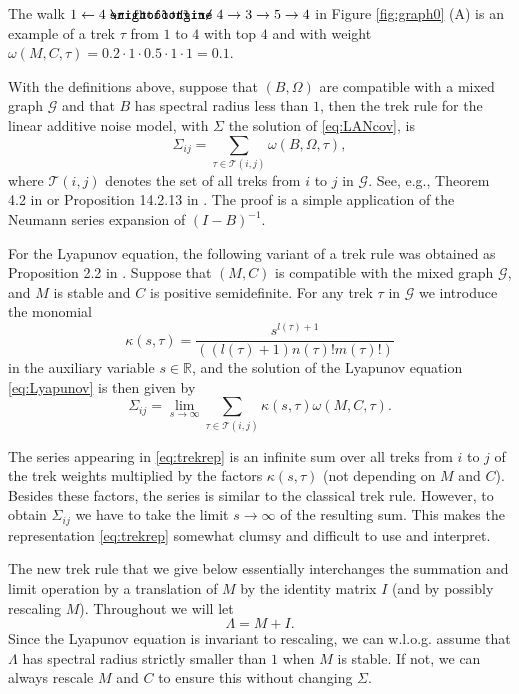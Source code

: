\documentclass[10pt,twoside,a4paper]{amsart}
\DeclareRobustCommand{\unEdge}{%
	\mathrel{%
		\text{%
			\ooalign{$\rightfootline$\cr\reflectbox{$\rightfootline$}\cr}%
		}%
	}%
}
\begin{document}
The walk $1 \leftarrow 4 \unEdge 4  \rightarrow 3 \rightarrow 5 \rightarrow 4$ 
in Figure \ref{fig:graph0} (A) is an example of a trek $\tau$ from $1$ to $4$ with top $4$ 
and with weight $\omega(M, C, \tau) =  0.2 \cdot 1 \cdot 0.5 \cdot 1 \cdot 1 = 0.1$.


With the definitions above, suppose that $(B, \Omega)$ are compatible with a
mixed graph $\mathcal{G}$ and that $B$ has spectral radius less than $1$, then
the trek rule for the linear additive noise model, with $\Sigma$ the solution of
\eqref{eq:LANcov}, is 
\[
    \Sigma_{ij} = \sum_{\tau \in \mathcal{T}(i,j)} \omega(B, \Omega, \tau),
\]
where $ \mathcal{T}(i,j)$ denotes the set of all treks from $i$ to $j$ in
$\mathcal{G}$. See, e.g., Theorem 4.2 in \cite{drton2018} or Proposition 14.2.13 in
\cite{sullivant2018algebraic}. The proof is a simple application of the Neumann
series expansion of $(I - B)^{-1}$. 

For the Lyapunov equation, the
following variant of a trek rule was obtained as Proposition 2.2 in \cite{varando2020}. 
Suppose that $(M, C)$ is compatible with the mixed graph $\mathcal{G}$, and $M$ is
stable and $C$ is positive semidefinite. For any trek $\tau$ in $\mathcal{G}$
we introduce the monomial 
\[
    \kappa(s, \tau) = \frac{s^{l(\tau) + 1}}{((l(\tau) + 1)n(\tau)!m(\tau)!)}
\]
in the auxiliary variable $s \in \mathbb{R}$, and the solution of the Lyapunov
    equation \eqref{eq:Lyapunov} is then given by
    \begin{equation} \label{eq:trekrep}
    \Sigma_{ij} = \lim_{s \rightarrow \infty} 
    \sum_{\tau \in \mathcal{T}(i,j)} \kappa(s, \tau) \omega(M, C, \tau).
    \end{equation}


The series appearing in \eqref{eq:trekrep} is an infinite sum 
over all treks from $i$ to $j$ of the trek weights multiplied by
the factors $\kappa(s, \tau)$ (not depending on $M$ and $C$). Besides 
these factors, the series is similar to the classical trek rule. However, 
to obtain $\Sigma_{ij}$ we have to take the limit 
$s \rightarrow \infty$ of the resulting sum. This makes the representation
\eqref{eq:trekrep} somewhat clumsy and difficult to use and interpret.

The new trek rule that we give below essentially 
interchanges the summation and limit operation by a translation of 
$M$ by the identity matrix $I$ (and by possibly rescaling $M$). 
Throughout we will let
\begin{equation} \label{eq:Lambda}
    \Lambda = M + I.
\end{equation}
Since the Lyapunov equation is invariant to rescaling, 
we can w.l.o.g. assume that $\Lambda$ has spectral radius strictly smaller than 
$1$ when $M$ is stable. If not, we can always rescale $M$ and $C$ to ensure this
without changing $\Sigma$.
\end{document}
